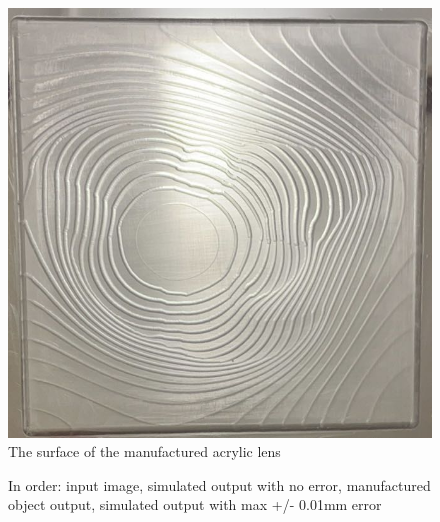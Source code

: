 \documentclass[10pt,two column]{configuration/unoesc}
\begin{document}
\begin{figure}[h!]
\centering
\includegraphics[width=0.5\linewidth]{figures/surface.jpg} 
\caption{The surface of the manufactured acrylic lens}
\label{fig:7}
\end{figure}

\begin{figure}[h!]
\hspace{0.01\textwidth}
\hspace{0.01\textwidth}
\hspace{0.02\textwidth}
\caption{In order: input image, simulated output with no error, manufactured object output, simulated output with max +/- 0.01mm error}
\label{fig:8}
\end{figure}
\end{document}
